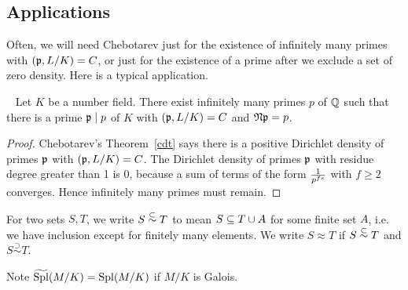 \subsection{Applications}
Often, we will need Chebotarev just for the existence of infinitely many primes with $(\mathfrak{p},L/K)=C$, or just for the existence of a prime after we exclude a set of zero density. Here is a typical application.
\begin{cor}~
Let $K$ be a number field. 
There exist infinitely many primes $p$ of $\mathbb{Q}$ such that there is a prime $\mathfrak{p}\mid p$ of $K$ with $(\mathfrak{p},L/K)=C$ and $\mathfrak{N} \mathfrak{p}=p$.
\end{cor}
\begin{proof}
Chebotarev's Theorem~\ref{cdt} says there is a positive Dirichlet density of primes  $\mathfrak{p}$ with $(\mathfrak{p},L/K)=C$. The Dirichlet density of primes $\mathfrak{p}$ with residue degree greater than 1 is 0, because a sum of terms of the form $\frac{1}{p^{fs}}$ with $f\ge 2$ converges. Hence infinitely many primes must remain.
\end{proof}
\begin{df}
For two sets $S,T$, we write $S\stackrel{\subset}{\sim}T$ to mean $S\subseteq T\cup A$ for some finite set $A$, i.e. we have inclusion except for finitely many elements. We write $S\approx T$ if $S\stackrel{\subset}{\sim} T$ and $S\stackrel{\supset}{\sim} T$.
\end{df}
Note $\widetilde{\operatorname{Spl}}(M/K)=\operatorname{Spl}(M/K)$ if $M/K$ is Galois.

